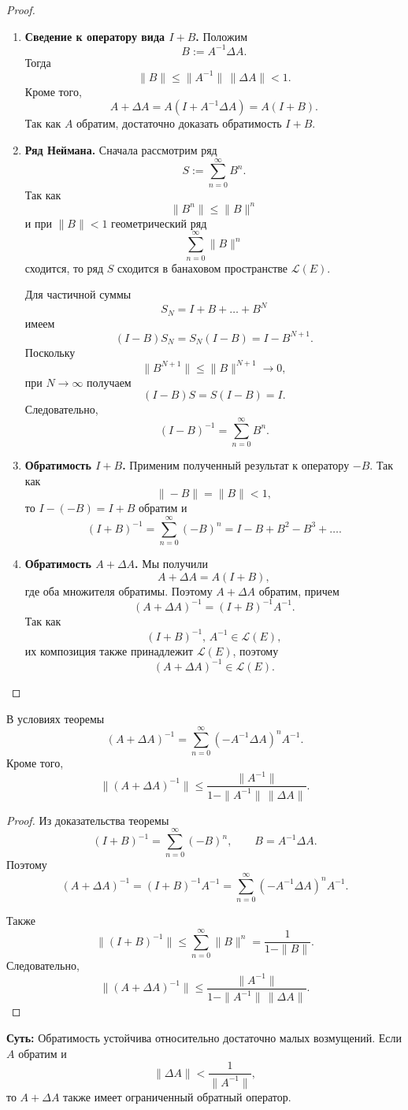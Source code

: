 \begin{proof}
	\begin{enumerate}
		\item \textbf{Сведение к оператору вида $I+B$.}
		Положим
		\[
		B:=A^{-1}\Delta A.
		\]
		Тогда
		\[
		\|B\|
		\leqslant
		\|A^{-1}\|\,\|\Delta A\|
		<1.
		\]
		Кроме того,
		\[
		A+\Delta A
		=
		A(I+A^{-1}\Delta A)
		=
		A(I+B).
		\]
		Так как $A$ обратим, достаточно доказать обратимость $I+B$.
		
		\item \textbf{Ряд Неймана.}
		Сначала рассмотрим ряд
		\[
		S:=\sum_{n=0}^{\infty}B^n.
		\]
		Так как
		\[
		\|B^n\|\leqslant\|B\|^n
		\]
		и при $\|B\|<1$ геометрический ряд
		\[
		\sum_{n=0}^{\infty}\|B\|^n
		\]
		сходится, то ряд $S$ сходится в банаховом пространстве
		$\mathcal{L}(E)$.
		
		Для частичной суммы
		\[
		S_N=I+B+\ldots+B^N
		\]
		имеем
		\[
		(I-B)S_N=S_N(I-B)=I-B^{N+1}.
		\]
		Поскольку
		\[
		\|B^{N+1}\|
		\leqslant
		\|B\|^{N+1}
		\to0,
		\]
		при $N\to\infty$ получаем
		\[
		(I-B)S=S(I-B)=I.
		\]
		Следовательно,
		\[
		(I-B)^{-1}
		=
		\sum_{n=0}^{\infty}B^n.
		\]
		
		\item \textbf{Обратимость $I+B$.}
		Применим полученный результат к оператору $-B$.
		Так как
		\[
		\|-B\|=\|B\|<1,
		\]
		то $I-(-B)=I+B$ обратим и
		\[
		(I+B)^{-1}
		=
		\sum_{n=0}^{\infty}(-B)^n
		=
		I-B+B^2-B^3+\ldots.
		\]
		
		\item \textbf{Обратимость $A+\Delta A$.}
		Мы получили
		\[
		A+\Delta A=A(I+B),
		\]
		где оба множителя обратимы. Поэтому $A+\Delta A$ обратим, причем
		\[
		(A+\Delta A)^{-1}
		=
		(I+B)^{-1}A^{-1}.
		\]
		Так как
		\[
		(I+B)^{-1},\,A^{-1}\in\mathcal{L}(E),
		\]
		их композиция также принадлежит $\mathcal{L}(E)$, поэтому
		\[
		(A+\Delta A)^{-1}\in\mathcal{L}(E).
		\]
	\end{enumerate}
\end{proof}

\begin{corollary}
	В условиях теоремы
	\[
	(A+\Delta A)^{-1}
	=
	\sum_{n=0}^{\infty}
	(-A^{-1}\Delta A)^n A^{-1}.
	\]
	Кроме того,
	\[
	\|(A+\Delta A)^{-1}\|
	\leqslant
	\frac{\|A^{-1}\|}
	{1-\|A^{-1}\|\,\|\Delta A\|}.
	\]
\end{corollary}

\begin{proof}
	Из доказательства теоремы
	\[
	(I+B)^{-1}
	=
	\sum_{n=0}^{\infty}(-B)^n,
	\qquad
	B=A^{-1}\Delta A.
	\]
	Поэтому
	\[
	(A+\Delta A)^{-1}
	=
	(I+B)^{-1}A^{-1}
	=
	\sum_{n=0}^{\infty}
	(-A^{-1}\Delta A)^n A^{-1}.
	\]
	
	Также
	\[
	\|(I+B)^{-1}\|
	\leqslant
	\sum_{n=0}^{\infty}\|B\|^n
	=
	\frac{1}{1-\|B\|}.
	\]
	Следовательно,
	\[
	\|(A+\Delta A)^{-1}\|
	\leqslant
	\frac{\|A^{-1}\|}
	{1-\|A^{-1}\|\,\|\Delta A\|}.
	\]
\end{proof}

\begin{idea}
	\textbf{Суть:} Обратимость устойчива относительно достаточно малых
	возмущений. Если $A$ обратим и
	\[
	\|\Delta A\| < \frac{1}{\|A^{-1}\|},
	\]
	то $A+\Delta A$ также имеет ограниченный обратный оператор.
\end{idea}